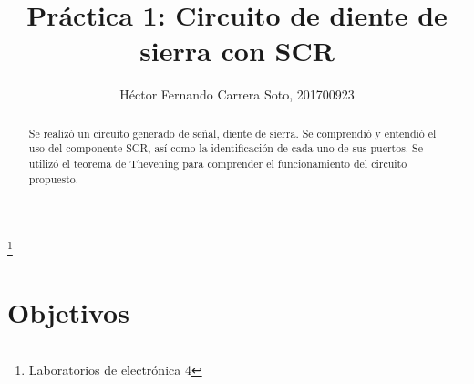 \documentclass[osajnl,twocolumn,showpacs,superscriptaddress,10pt]{revtex4-1}
\begin{document}

\title{Práctica 1: Circuito de diente de sierra con SCR}
\thanks{Laboratorios de electrónica 4}

\author{Héctor Fernando Carrera Soto, 201700923}
%





\begin{abstract}

    Se realizó un circuito generado de señal, diente de sierra. Se comprendió y entendió el uso del componente SCR, así como la identificación de cada uno de sus puertos. Se utilizó el teorema de Thevening para comprender el funcionamiento del circuito propuesto.

\end{abstract}



\maketitle{}


\section{Objetivos}

    
\end{document}
